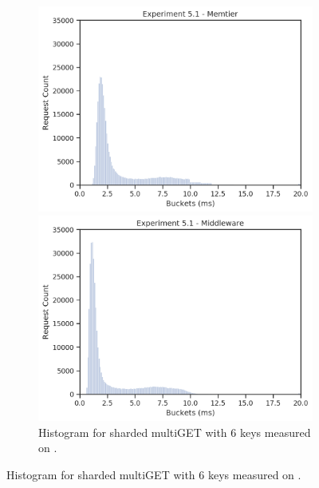         \begin{figure}
            \vspace*{-.5\baselineskip}
                \centering
            \begin{subfigure}[t!]{0.48\textwidth}
                \centering
                \includegraphics[width=\textwidth]{../data_analysis/figures/5-1_mt_histogram.png}
                \caption{Histogram for sharded multiGET with 6 keys measured on \cli.\label{fig:histogram_sharded_mt}}
                \includegraphics[width=\textwidth]{../data_analysis/figures/5-1_mw_histogram.png}
                \caption{Histogram for sharded multiGET with 6 keys measured on \mw.\label{fig:histogram_sharded_mw}}
            \end{subfigure}

\end{figure}
